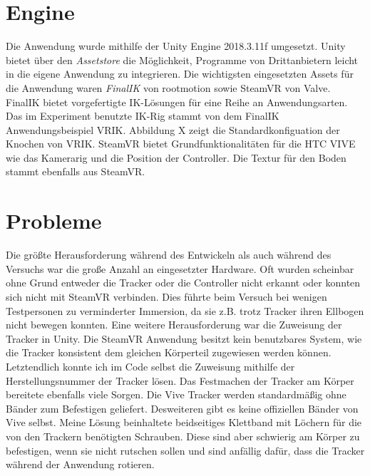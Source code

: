\section{Engine}
Die Anwendung wurde mithilfe der Unity Engine 2018.3.11f umgesetzt.
Unity bietet über den \textit{Assetstore} die Möglichkeit, Programme von Drittanbietern leicht in die eigene Anwendung zu integrieren. Die wichtigsten eingesetzten Assets für die Anwendung waren \textit{FinalIK} von rootmotion\cite{rootmotion} sowie SteamVR von Valve. FinalIK bietet vorgefertigte IK-Lösungen für eine Reihe an Anwendungsarten. Das im Experiment benutzte IK-Rig stammt von dem FinalIK Anwendungsbeispiel VRIK. Abbildung X zeigt die Standardkonfiguation der Knochen von VRIK. SteamVR bietet Grundfunktionalitäten für die HTC VIVE wie das Kamerarig und die Position der Controller. Die Textur für den Boden stammt ebenfalls aus SteamVR.


\section{Probleme}
Die größte Herausforderung während des Entwickeln als auch während des Versuchs war die große Anzahl an eingesetzter Hardware. Oft wurden scheinbar ohne Grund entweder die Tracker oder die Controller nicht erkannt oder konnten sich nicht mit SteamVR verbinden. Dies führte beim Versuch bei wenigen Testpersonen zu verminderter Immersion, da sie z.B. trotz Tracker ihren Ellbogen nicht bewegen konnten. 
Eine weitere Herausforderung war die Zuweisung der Tracker in Unity. Die SteamVR Anwendung besitzt kein benutzbares System, wie die Tracker konsistent dem gleichen Körperteil zugewiesen werden können. Letztendlich konnte ich im Code selbst die Zuweisung mithilfe der Herstellungsnummer der Tracker lösen.
Das Festmachen der Tracker am Körper bereitete ebenfalls viele Sorgen. Die Vive Tracker werden standardmäßig ohne Bänder zum Befestigen geliefert. Desweiteren gibt es keine offiziellen Bänder von Vive selbst. Meine Lösung beinhaltete beidseitiges Klettband mit Löchern für die von den Trackern benötigten Schrauben. Diese sind aber schwierig am Körper zu befestigen, wenn sie nicht rutschen sollen und sind anfällig dafür, dass die Tracker während der Anwendung rotieren.
 
